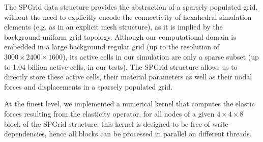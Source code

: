 The SPGrid data structure provides the abstraction of a sparsely populated grid, without the need to explicitly
encode the connectivity of hexahedral simulation elements (e.g. as in an explicit mesh structure), as it is implied by
the background uniform grid topology. Although our computational domain is embedded in a large background regular grid
(up to the resolution of $3000\times 2400\times 1600$), its active cells in our simulation are only a sparse subset (up to 1.04 billion active cells, in our tests). The SPGrid structure allows us to directly store these active cells,
their material parameters as well as their nodal forces and displacements in a
sparsely populated grid. 

At the finest level, we
implemented a numerical kernel that computes the elastic forces resulting from the elasticity operator, for all nodes of a
given $4\times 4\times 8$ block of the SPGrid structure; this kernel is designed to be free of write-dependencies, hence
all blocks can be processed in parallel on different threads.

